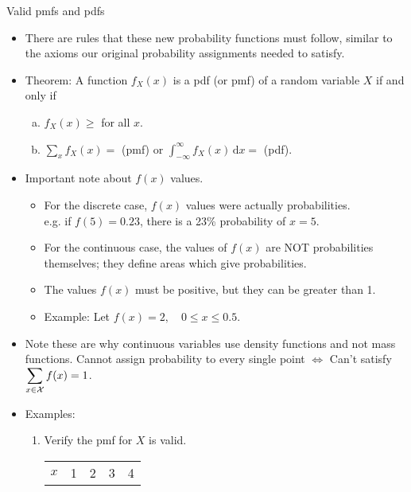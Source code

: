 \documentclass{article}
\newcommand{\integral}[4]{\displaystyle \int_{#1}^{#2} #3 \,\mathrm{d} #4}		%
\begin{document}
Valid pmfs and pdfs\bigskip
\begin{itemize}
    \item There are rules that these new probability functions must follow, similar to the axioms our original probability assignments needed to satisfy.\bigskip
    \item Theorem: A function $f_X(x)$ is a pdf (or pmf) of a random variable $X$ if and only if
    \begin{enumerate}[(a)]
        \item  $f_X(x) \ge $ \hspace{10pt} for all $x$.
        \item $\displaystyle \sum_x f_X(x) = $ \hspace{10pt} (pmf) \hspace{20pt} or \hspace{20pt} $\integral{-\infty}{\infty} {f_X(x)}{x} = $ \hspace{10pt} (pdf). 
    \end{enumerate}
    \item Important note about $f(x)$ values.
    \begin{itemize}
        \item For the discrete case, $f(x)$ values were actually probabilities. \\ e.g. if $f(5) = 0.23$, there is a 23\% probability of $x = 5$.
        \item For the continuous case, the values of $f(x)$ are NOT probabilities themselves; they define areas which give probabilities.
        \item[] The values $f(x)$ must be positive, but they can be greater than 1.
        \item[] Example: Let $f(x) = 2, \quad 0 \le x \le 0.5$.
    \end{itemize}\bigskip
    \item Note these are why continuous variables use density functions and not mass functions. Cannot assign probability to every single point $\Longleftrightarrow$ Can't satisfy $\displaystyle \sum_{x \in {\cal X}} f(x) = 1$.\bigskip
    \item Examples:
    \begin{enumerate}
        \item Verify the pmf for $X$ is valid.\bigskip\\
        \begin{tabular}{| l | c | c | c | c |}
             \hline
             $x$ & 1 & 2 & 3 & 4\\

\end{tabular}
\end{enumerate}
\end{itemize}
\end{document}
